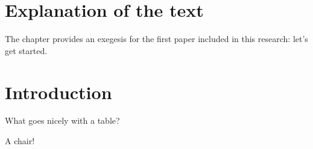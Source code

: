 \section{Explanation of the text}

The chapter provides an exegesis for the first paper included in this research: let's get started. 

\section{Introduction}
What goes nicely with a table? 



A chair!